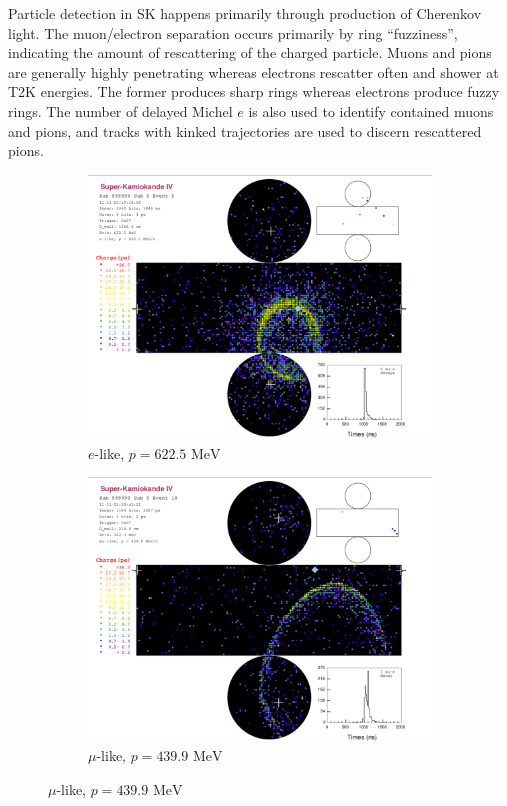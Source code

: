 Particle detection in SK happens primarily through production of Cherenkov light. The muon/electron separation occurs primarily by ring ``fuzziness'', indicating the amount of rescattering of the charged particle. Muons and pions are generally highly penetrating whereas electrons rescatter often and shower at T2K energies. The former produces sharp rings whereas electrons produce fuzzy rings. The number of delayed Michel $e$ is also used to identify contained muons and pions, and tracks with kinked trajectories are used to discern rescattered pions.
\begin{figure}[h]
	\begin{subfigure}[t]{0.48\textwidth}
		\includegraphics[width=\textwidth, trim={0mm 0mm 0mm 3mm}, clip,page=1]{figures/det_chap/sk/elike.pdf}
		\caption{$e$-like, $p=622.5\text{ MeV}$}
	\end{subfigure}
	\begin{subfigure}[t]{0.48\textwidth}
		\includegraphics[width=\textwidth, trim={0mm 0mm 0mm 3mm}, clip,page=1]{figures/det_chap/sk/mulike.pdf}
		\caption{$\mu$-like, $p=439.9\text{ MeV}$}
	\end{subfigure}
\end{figure}

